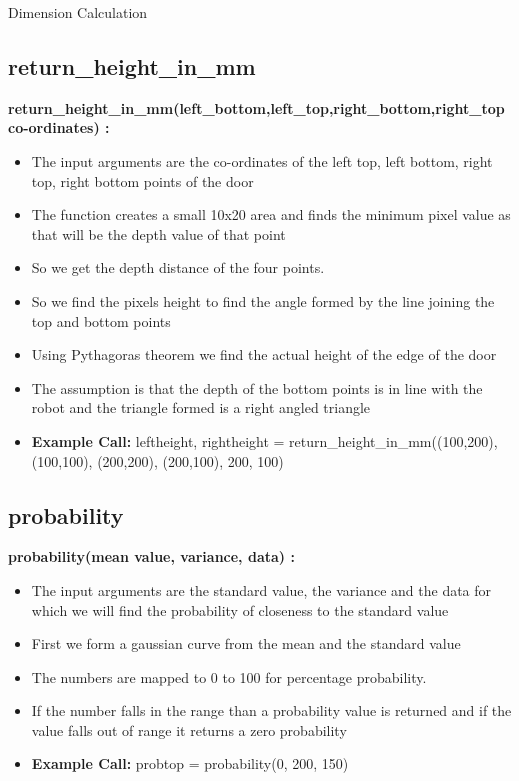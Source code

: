 \documentclass[10pt, a4paper]{beamer}
\begin{document}
\begin{frame}[allowframebreaks]{Dimension Calculation}
    \subsection{return\_height\_in\_mm}
      \textbf{return\_height\_in\_mm(left\_bottom,left\_top,right\_bottom,right\_top co-ordinates) : }
	\begin{itemize}
       \item The input arguments are the co-ordinates of the left top, left bottom, right top, right bottom points of the door
       \item The function creates a small 10x20 area and finds the minimum pixel value as that will be the depth value of that point
       \item So we get the depth distance of the four points.
       \item So we find the pixels height to find the angle formed by the line joining the top and bottom points
       \item Using Pythagoras theorem we find the actual height of the edge of the door
       \item The assumption is that the depth of the bottom points is in line with the robot and the triangle formed is a right angled triangle
       \item \textbf{Example Call:} leftheight, rightheight = return\_height\_in\_mm((100,200), (100,100), (200,200), (200,100), 200, 100)
	\end{itemize}
  \framebreak
    \subsection{probability}
      \textbf{probability(mean value, variance, data) : }
	\begin{itemize}
	 \item The input arguments are the standard value, the variance and the data for which we will find the probability of closeness to the standard value
	 \item First we form a gaussian curve from the mean and the standard value
	 \item The numbers are mapped to 0 to 100 for percentage probability.
	 \item If the number falls in the range than a probability value is returned and if the value falls out of range it returns a zero probability
	 \item \textbf{Example Call:} probtop = probability(0, 200, 150)
	\end{itemize}
\end{frame}
\end{document}
